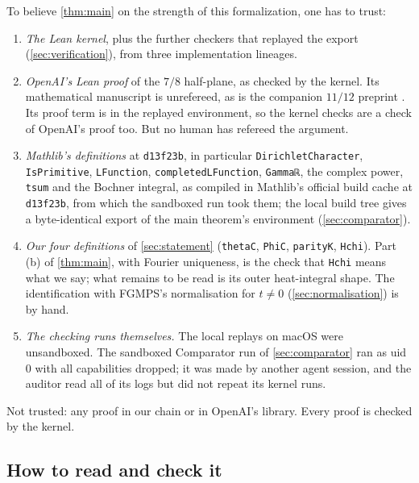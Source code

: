 \documentclass[11pt]{article}
\theoremstyle{definition}
\newcommand{\lean}[1]{\texttt{#1}}
\begin{document}
To believe \cref{thm:main} on the strength of this formalization, one has to trust:
\begin{enumerate}
\item \emph{The Lean kernel}, plus the further checkers that replayed the export (\cref{sec:verification}), from three implementation lineages.
\item \emph{OpenAI's Lean proof} of the $7/8$ half-plane, as checked by the kernel. Its mathematical manuscript \cite{OAI7over8} is unrefereed, as is the companion $11/12$ preprint \cite{OAIqrh}. Its proof term is in the replayed environment, so the kernel checks are a check of OpenAI's proof too. But no human has refereed the argument.
\item \emph{Mathlib's definitions} at \lean{d13f23b}, in particular \lean{DirichletCharacter}, \lean{IsPrimitive}, \lean{LFunction}, \lean{completedLFunction}, \lstinline[basicstyle=\ttfamily,backgroundcolor={}]|Gammaℝ|, the complex power, \lean{tsum} and the Bochner integral, as compiled in Mathlib's official build cache at \lean{d13f23b}, from which the sandboxed run took them; the local build tree gives a byte-identical export of the main theorem's environment (\cref{sec:comparator}).
\item \emph{Our four definitions} of \cref{sec:statement} (\lean{thetaC}, \lean{PhiC}, \lean{parityK}, \lean{Hchi}). Part (b) of \cref{thm:main}, with Fourier uniqueness, is the check that \lean{Hchi} means what we say; what remains to be read is its outer heat-integral shape. The identification with FGMPS's normalisation for $t \ne 0$ (\cref{sec:normalisation}) is by hand.
\item \emph{The checking runs themselves.} The local replays on macOS were unsandboxed. The sandboxed Comparator run of \cref{sec:comparator} ran as uid 0 with all capabilities dropped; it was made by another agent session, and the auditor read all of its logs but did not repeat its kernel runs.
\end{enumerate}
Not trusted: any proof in our chain or in OpenAI's library. Every proof is checked by the kernel.

\subsection{How to read and check it}
\end{document}

